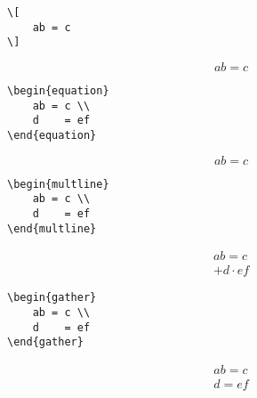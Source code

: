 \setlength{\columnseprule}{0.5pt } %


\newcommand{\myhruleB}{
	\myhrule\negAbstand
	}

\begin{multicols}{2}
\begin{lstlisting}
\[
	ab = c
\]
\end{lstlisting}
\columnbreak \hspace{0.5\baselineskip}
\[
	ab = c
\]
\end{multicols}

\myhruleB

\begin{multicols}{2}
\begin{lstlisting}
\begin{equation} 
	ab = c \\
	d	 = ef
\end{equation}
\end{lstlisting}
\columnbreak
\begin{equation} 
	ab = c 
\end{equation}
\end{multicols}


\myhruleB

\begin{multicols}{2}
\begin{lstlisting}
\begin{multline} 
	ab = c \\
	d	 = ef
\end{multline}
\end{lstlisting}
\begin{multline} 
	ab = c \\
	+ d \cdot ef
\end{multline}
\end{multicols}

\myhruleB

\begin{multicols}{2}
\begin{lstlisting}
\begin{gather} 
	ab = c \\
	d	 = ef
\end{gather}
\end{lstlisting}
\begin{gather} 
	ab = c \\
	d	 = ef
\end{gather}
\end{multicols}

